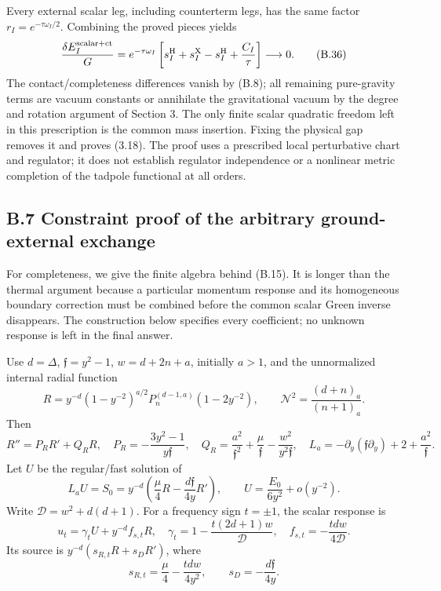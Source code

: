 \documentclass[a4paper,11pt]{article}
\numberwithin{equation}{section}
\begin{document}
Every external scalar leg, including counterterm legs, has the same factor \(r_I=e^{-\tau\omega_I/2}\). Combining the proved pieces yields \[
\frac{\delta E_I^{\rm scalar+ct}}G
=e^{-\tau\omega_I}
\left[s_I^{\rm H}+s_I^{\rm X}-s_I^{\rm H}
+\frac{C_I}{\tau}\right]
\longrightarrow0 .
\tag{B.36}
\] The contact/completeness differences vanish by (B.8); all remaining pure-gravity terms are vacuum constants or annihilate the gravitational vacuum by the degree and rotation argument of Section 3. The only finite scalar quadratic freedom left in this prescription is the common mass insertion. Fixing the physical gap removes it and proves (3.18). The proof uses a prescribed local perturbative chart and regulator; it does not establish regulator independence or a nonlinear metric completion of the tadpole functional at all orders.

\hypertarget{b.7-constraint-proof-of-the-arbitrary-ground-external-exchange}{%
\subsection{B.7 Constraint proof of the arbitrary ground-external exchange}\label{b.7-constraint-proof-of-the-arbitrary-ground-external-exchange}}

For completeness, we give the finite algebra behind (B.15). It is longer than the thermal argument because a particular momentum response and its homogeneous boundary correction must be combined before the common scalar Green inverse disappears. The construction below specifies every coefficient; no unknown response is left in the final answer.

Use \(d=\Delta\), \(\mathfrak f=y^2-1\), \(w=d+2n+a\), initially \(a>1\), and the unnormalized internal radial function \[
R=y^{-d}(1-y^{-2})^{a/2}
P_n^{(d-1,a)}(1-2y^{-2}),\qquad
\mathcal N^2=\frac{(d+n)_a}{(n+1)_a}.
\] Then \[
R''=P_RR'+Q_RR,\quad
P_R=-\frac{3y^2-1}{y\mathfrak f},\quad
Q_R=\frac{a^2}{\mathfrak f^2}+\frac{\mu}{\mathfrak f}
-\frac{w^2}{y^2\mathfrak f},
\quad
L_a=-\partial_y(\mathfrak f\partial_y)+2+\frac{a^2}{\mathfrak f}.
\tag{B.37}
\] Let \(U\) be the regular/fast solution of \[
L_aU=S_0=y^{-d}
\left(\frac{\mu}{4}R-\frac{d\mathfrak f}{4y}R'\right),
\qquad
U=\frac{E_0}{6y^2}+o(y^{-2}).
\tag{B.38}
\] Write \(\mathcal D=w^2+d(d+1)\). For a frequency sign \(t=\pm1\), the scalar response is \[
u_t=\gamma_tU+y^{-d}f_{s,t}R,\quad
\gamma_t=1-\frac{t(2d+1)w}{\mathcal D},\quad
f_{s,t}=-\frac{tdw}{4\mathcal D}.
\tag{B.39}
\] Its source is \(y^{-d}(s_{R,t}R+s_DR')\), where \[
s_{R,t}=\frac{\mu}{4}-\frac{tdw}{4y^2},
\qquad s_D=-\frac{d\mathfrak f}{4y}.
\]
\end{document}
